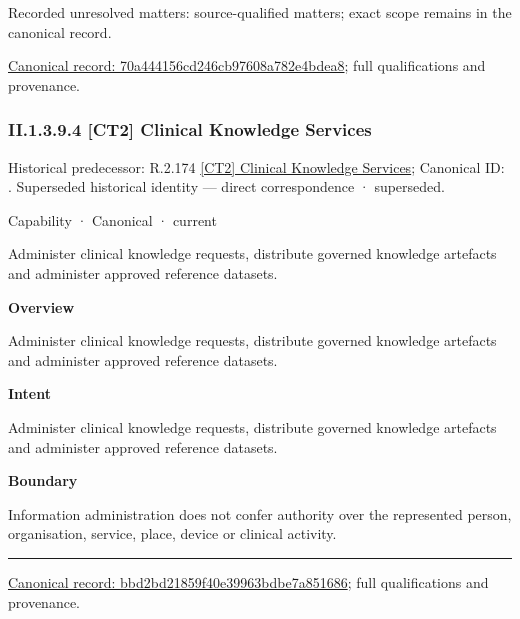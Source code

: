 {\small Recorded unresolved matters: source-qualified matters; exact scope remains in the canonical record.}\par
{\footnotesize \href{../../../../continuum/strategy/capability/feature/70a444156cd246cb97608a782e4bdea8.md}{Canonical record: 70a444156cd246cb97608a782e4bdea8}; full qualifications and provenance.}\par
\subsubsection*{II.1.3.9.4 [CT2] Clinical Knowledge Services}
\label{navigation:II.1.3.9.4}

{\small Historical predecessor: R.2.174 \hyperref[element:5b8478b08c3f42c0a3480edb8f0b9ea7]{[CT2] Clinical Knowledge Services}; Canonical ID: \texttt{}. Superseded historical identity — direct correspondence · superseded.}\par
\label{element:bbd2bd21859f40e39963bdbe7a851686}
{\small Capability · Canonical · current}\par

Administer clinical knowledge requests, distribute governed knowledge artefacts and administer approved reference datasets.



\textbf{Overview}



Administer clinical knowledge requests, distribute governed knowledge artefacts and administer approved reference datasets.



\textbf{Intent}



Administer clinical knowledge requests, distribute governed knowledge artefacts and administer approved reference datasets.



\textbf{Boundary}



Information administration does not confer authority over the represented person, organisation, service, place, device or clinical activity.



\medskip\hrule\medskip

{\footnotesize \href{../../../../continuum/strategy/capability/bbd2bd21859f40e39963bdbe7a851686.md}{Canonical record: bbd2bd21859f40e39963bdbe7a851686}; full qualifications and provenance.}\par
